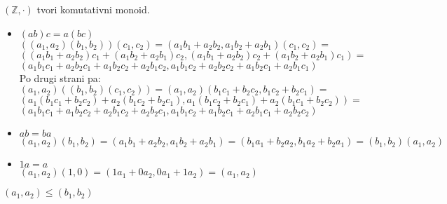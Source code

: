\begin{trditev}
    $(\mathbb{Z}, \cdot)$ tvori komutativni monoid.
\end{trditev}
\begin{dokaz}
    \begin{itemize}
        \item $(ab)c = a(bc)$\\
        $((a_1,a_2)(b_1,b_2))(c_1,c_2) = (a_1 b_1 + a_2 b_2, a_1 b_2 + a_2 b_1)(c_1, c_2) = $
        $((a_1 b_1 + a_2 b_2)c_1 + (a_1 b_2 + a_2 b_1)c_2, (a_1 b_1 + a_2 b_2)c_2 + (a_1 b_2 + a_2 b_1)c_1) = $
        $(a_1 b_1 c_1 + a_2 b_2 c_1 + a_1 b_2 c_2 + a_2 b_1 c_2, a_1 b_1 c_2 + a_2 b_2 c_2 + a_1 b_2 c_1 + a_2 b_1 c_1)$ \\
        Po drugi strani pa:\\
        $(a_1,a_2)((b_1,b_2)(c_1,c_2)) = (a_1,a_2)(b_1 c_1 + b_2 c_2, b_1 c_2 + b_2 c_1) =$
        $(a_1(b_1 c_1 + b_2 c_2) + a_2(b_1 c_2 + b_2 c_1), a_1(b_1 c_2 + b_2 c_1) + a_2(b_1 c_1 + b_2 c_2)) =$
        $(a_1 b_1 c_1 + a_1 b_2 c_2 + a_2 b_1 c_2 + a_2 b_2 c_1, a_1 b_1 c_2 + a_1 b_2 c_1 + a_2 b_1 c_1 + a_2 b_2 c_2)$
        \item $ab = ba$\\
        $(a_1, a_2)(b_1, b_2) = (a_1 b_1 + a_2 b_2, a_1 b_2 + a_2 b_1) = (b_1 a_1 + b_2 a_2, b_1 a_2 + b_2 a_1) = (b_1, b_2)(a_1, a_2)$
        \item $1a = a$\\
        $(a_1, a_2)(1, 0) = (1 a_1 + 0 a_2, 0 a_1 + 1 a_2) = (a_1, a_2)$
    \end{itemize}
\end{dokaz}

\begin{definicija}
    $(a_1, a_2) \leq (b_1, b_2)$
\end{definicija}